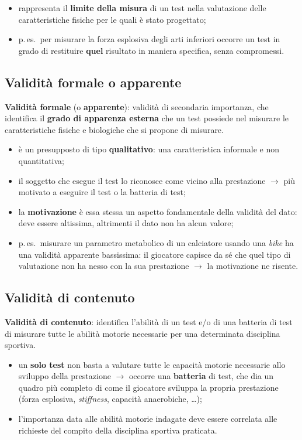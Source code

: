 \begin{itemize}
  \item rappresenta il \textbf{limite della misura} di un test nella valutazione delle
    caratteristiche fisiche per le quali è stato progettato;
  \item p.\,es.\ per misurare la forza esplosiva degli arti inferiori occorre un test in grado di
    restituire \textbf{quel} risultato in maniera specifica, senza compromessi.
\end{itemize}

\subsection{Validità formale o apparente}

\textbf{Validità formale} (o \textbf{apparente}): validità di secondaria importanza, che identifica
il \textbf{grado di apparenza esterna} che un test possiede nel misurare le caratteristiche fisiche
e biologiche che si propone di misurare.

\begin{itemize}
  \item è un presupposto di tipo \textbf{qualitativo}: una caratteristica informale e non
    quantitativa;
  \item il soggetto che esegue il test lo riconosce come vicino alla prestazione $\rightarrow$ più
    motivato a eseguire il test o la batteria di test;
  \item la \textbf{motivazione} è essa stessa un aspetto fondamentale della validità del dato: deve
    essere altissima, altrimenti il dato non ha alcun valore;
  \item p.\,es.\ misurare un parametro metabolico di un calciatore usando una \textit{bike} ha una
    validità apparente bassissima: il giocatore capisce da sé che quel tipo di valutazione non ha
    nesso con la sua prestazione $\rightarrow$ la motivazione ne risente.
\end{itemize}

\subsection{Validità di contenuto}

\textbf{Validità di contenuto}: identifica l'abilità di un test e/o di una batteria di test di
misurare tutte le abilità motorie necessarie per una determinata disciplina sportiva.

\begin{itemize}
  \item un \textbf{solo test} non basta a valutare tutte le capacità motorie necessarie allo
    sviluppo della prestazione $\rightarrow$ occorre una \textbf{batteria} di test, che dia un
    quadro più completo di come il giocatore sviluppa la propria prestazione (forza esplosiva,
    \textit{stiffness}, capacità anaerobiche, \dots);
  \item l'importanza data alle abilità motorie indagate deve essere correlata alle richieste del
    compito della disciplina sportiva praticata.
\end{itemize}

